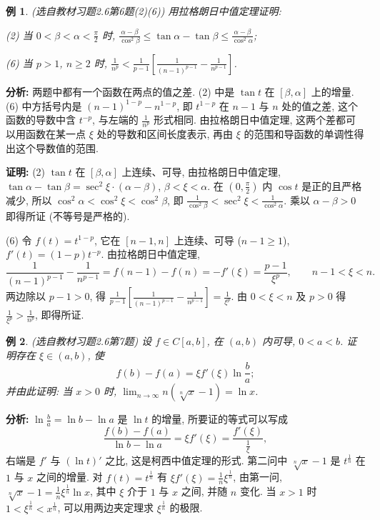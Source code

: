 \documentclass[UTF8,openany]{ctexbook}
\theoremstyle{chinesetextbook}
\newtheorem{example}{例}[section]
\newenvironment{cnproof}{\par\indent\textbf{证明:} \ignorespaces}{\par}
\begin{document}
\begin{example}\label{ex:c2-h6-6}
\textnormal{(选自教材习题2.6第6题(2)(6))} 用拉格朗日中值定理证明:

(2) 当 $\displaystyle0<\beta<\alpha<\frac\pi2$ 时, $\displaystyle\frac{\alpha-\beta}{\cos^2\beta}\le\tan\alpha-\tan\beta\le\frac{\alpha-\beta}{\cos^2\alpha}$;

(6) 当 $p>1$, $n\ge2$ 时, $\displaystyle\frac1{n^p}<\frac1{p-1}\left[\frac1{(n-1)^{p-1}}-\frac1{n^{p-1}}\right]$.
\end{example}
\par\indent\textbf{分析:} 两题中都有一个函数在两点的值之差. (2) 中是 $\tan t$ 在 $[\beta,\alpha]$ 上的增量. (6) 中方括号内是 $(n-1)^{1-p}-n^{1-p}$, 即 $t^{1-p}$ 在 $n-1$ 与 $n$ 处的值之差, 这个函数的导数中含 $t^{-p}$, 与左端的 $\displaystyle\frac1{n^p}$ 形式相同. 由拉格朗日中值定理, 这两个差都可以用函数在某一点 $\xi$ 处的导数和区间长度表示, 再由 $\xi$ 的范围和导函数的单调性得出这个导数值的范围.
\begin{cnproof}
(2) $\tan t$ 在 $[\beta,\alpha]$ 上连续、可导, 由拉格朗日中值定理, $\tan\alpha-\tan\beta=\sec^2\xi\cdot(\alpha-\beta)$, $\beta<\xi<\alpha$. 在 $\displaystyle\left(0,\frac\pi2\right)$ 内 $\cos t$ 是正的且严格减少, 所以 $\cos^2\alpha<\cos^2\xi<\cos^2\beta$, 即 $\displaystyle\frac1{\cos^2\beta}<\sec^2\xi<\frac1{\cos^2\alpha}$. 乘以 $\alpha-\beta>0$ 即得所证 (不等号是严格的).

(6) 令 $f(t)=t^{1-p}$, 它在 $[n-1,n]$ 上连续、可导 ($n-1\ge1$), $f'(t)=(1-p)t^{-p}$. 由拉格朗日中值定理,
\[
\frac1{(n-1)^{p-1}}-\frac1{n^{p-1}}=f(n-1)-f(n)=-f'(\xi)=\frac{p-1}{\xi^p},\qquad n-1<\xi<n.
\]
两边除以 $p-1>0$, 得 $\displaystyle\frac1{p-1}\left[\frac1{(n-1)^{p-1}}-\frac1{n^{p-1}}\right]=\frac1{\xi^p}$. 由 $0<\xi<n$ 及 $p>0$ 得 $\displaystyle\frac1{\xi^p}>\frac1{n^p}$, 即得所证.
\end{cnproof}
\begin{example}\label{ex:c2-h6-7}
\textnormal{(选自教材习题2.6第7题)} 设 $f\in C[a,b]$, 在 $(a,b)$ 内可导, $0<a<b$. 证明存在 $\xi\in(a,b)$, 使
\[
f(b)-f(a)=\xi f'(\xi)\ln\frac ba;
\]
并由此证明: 当 $x>0$ 时, $\displaystyle\lim_{n\to\infty}n\left(\sqrt[n]x-1\right)=\ln x$.
\end{example}
\par\indent\textbf{分析:} $\displaystyle\ln\frac ba=\ln b-\ln a$ 是 $\ln t$ 的增量, 所要证的等式可以写成
\[
\frac{f(b)-f(a)}{\ln b-\ln a}=\xi f'(\xi)=\frac{f'(\xi)}{\frac1\xi},
\]
右端是 $f'$ 与 $(\ln t)'$ 之比, 这是柯西中值定理的形式. 第二问中 $\sqrt[n]x-1$ 是 $t^{\frac1n}$ 在 $1$ 与 $x$ 之间的增量. 对 $f(t)=t^{\frac1n}$ 有 $\displaystyle\xi f'(\xi)=\frac1n\xi^{\frac1n}$, 由第一问, $\displaystyle\sqrt[n]x-1=\frac1n\xi^{\frac1n}\ln x$, 其中 $\xi$ 介于 $1$ 与 $x$ 之间, 并随 $n$ 变化. 当 $x>1$ 时 $1<\xi^{\frac1n}<x^{\frac1n}$, 可以用两边夹定理求 $\xi^{\frac1n}$ 的极限.
\end{document}
